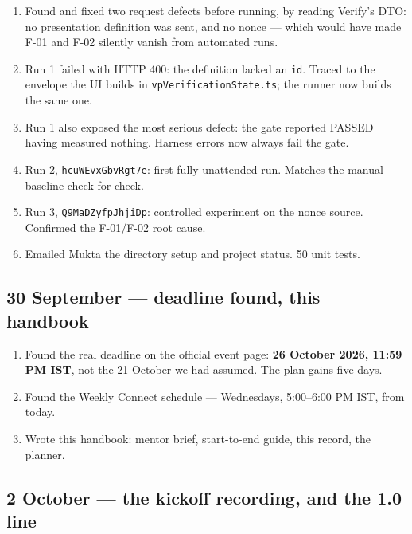 \documentclass[10pt,a4paper]{article}
\newcommand{\tightlist}{\setlength{\itemsep}{1pt}\setlength{\parskip}{0pt}\setlength{\parsep}{0pt}}
\begin{document}
\begin{enumerate}\tightlist
  \item Found and fixed two request defects before running, by reading Verify's DTO:
        no presentation definition was sent, and no nonce --- which would have made F-01
        and F-02 silently vanish from automated runs.
  \item Run 1 failed with HTTP 400: the definition lacked an \texttt{id}. Traced to the
        envelope the UI builds in \texttt{vpVerificationState.ts}; the runner now builds
        the same one.
  \item Run 1 also exposed the most serious defect: the gate reported PASSED having
        measured nothing. Harness errors now always fail the gate.
  \item Run 2, \texttt{hcuWEvxGbvRgt7e}: first fully unattended run. Matches the manual
        baseline check for check.
  \item Run 3, \texttt{Q9MaDZyfpJhjiDp}: controlled experiment on the nonce source.
        Confirmed the F-01/F-02 root cause.
  \item Emailed Mukta the directory setup and project status. 50 unit tests.
\end{enumerate}

\subsection{30 September --- deadline found, this handbook}

\begin{enumerate}\tightlist
  \item Found the real deadline on the official event page: \textbf{26 October 2026,
        11:59 PM IST}, not the 21 October we had assumed. The plan gains five days.
  \item Found the Weekly Connect schedule --- Wednesdays, 5:00--6:00 PM IST, from today.
  \item Wrote this handbook: mentor brief, start-to-end guide, this record, the planner.
\end{enumerate}

\subsection{2 October --- the kickoff recording, and the 1.0 line}
\end{document}

